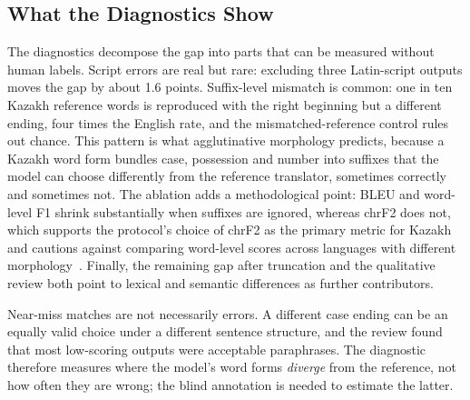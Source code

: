 \subsection{What the Diagnostics Show}
The diagnostics decompose the gap into parts that can be measured without human labels. Script errors are real but rare: excluding three Latin-script outputs moves the gap by about 1.6 points. Suffix-level mismatch is common: one in ten Kazakh reference words is reproduced with the right beginning but a different ending, four times the English rate, and the mismatched-reference control rules out chance. This pattern is what agglutinative morphology predicts, because a Kazakh word form bundles case, possession and number into suffixes that the model can choose differently from the reference translator, sometimes correctly and sometimes not. The ablation adds a methodological point: BLEU and word-level F1 shrink substantially when suffixes are ignored, whereas chrF2 does not, which supports the protocol's choice of chrF2 as the primary metric for Kazakh and cautions against comparing word-level scores across languages with different morphology~\cite{kocmi2021ship,popovic2015chrf}. Finally, the remaining gap after truncation and the qualitative review both point to lexical and semantic differences as further contributors.

Near-miss matches are not necessarily errors. A different case ending can be an equally valid choice under a different sentence structure, and the review found that most low-scoring outputs were acceptable paraphrases. The diagnostic therefore measures where the model's word forms \emph{diverge} from the reference, not how often they are wrong; the blind annotation is needed to estimate the latter.

